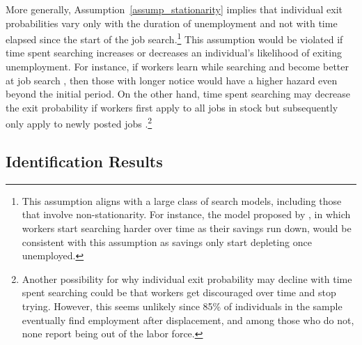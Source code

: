 \documentclass{div}
\begin{document}
More generally, Assumption~\ref{assump_stationarity} implies that individual exit probabilities vary only with the duration of unemployment and not with time elapsed since the start of the job search.\footnote{This assumption aligns with a large class of search models, including those that involve non-stationarity. For instance, the model proposed by \cite{LentzTranaes2005}, in which workers start searching harder over time as their savings run down, would be consistent with this assumption as savings only start depleting once unemployed.} This assumption would be violated if time spent searching increases or decreases an individual's likelihood of exiting unemployment. For instance, if workers learn while searching and become better at job search \citep{BurdettVishwanath1988, GonzalezShi2010}, then those with longer notice would have a higher hazard even beyond the initial period. On the other hand, time spent searching may decrease the exit probability if workers first apply to all jobs in stock but subsequently only apply to newly posted jobs \citep{ColesSmith1998}.\footnote{Another possibility for why individual exit probability may decline with time spent searching could be that workers get discouraged over time and stop trying. However, this seems unlikely since 85\% of individuals in the sample eventually find employment after displacement, and among those who do not, none report being out of the labor force.}


\subsection{Identification Results}\label{subsec_identification}
\end{document}

